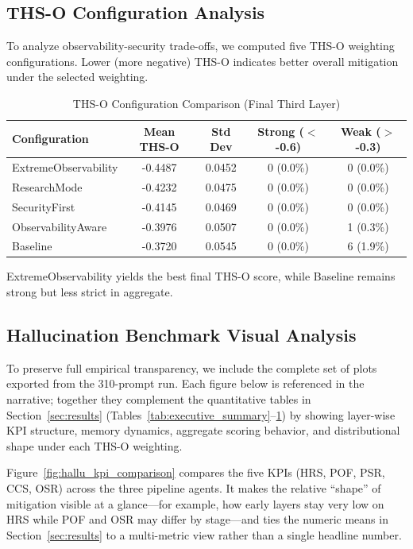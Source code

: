 \documentclass[11pt,a4paper]{article}
\begin{document}
\subsection{THS-O Configuration Analysis}

To analyze observability-security trade-offs, we computed five THS-O weighting configurations.
Lower (more negative) THS-O indicates better overall mitigation under the selected weighting.

\begin{table}[!htbp]
\centering
\caption{THS-O Configuration Comparison (Final Third Layer)}
\label{tab:ths_configs}
\begin{tabular}{lcccc}
\toprule
\textbf{Configuration} & \textbf{Mean THS-O} & \textbf{Std Dev} & \textbf{Strong ($<$ -0.6)} & \textbf{Weak ($>$ -0.3)} \\
\midrule
ExtremeObservability & -0.4487 & 0.0452 & 0 (0.0\%) & 0 (0.0\%) \\
ResearchMode & -0.4232 & 0.0475 & 0 (0.0\%) & 0 (0.0\%) \\
SecurityFirst & -0.4145 & 0.0469 & 0 (0.0\%) & 0 (0.0\%) \\
ObservabilityAware & -0.3976 & 0.0507 & 0 (0.0\%) & 1 (0.3\%) \\
Baseline & -0.3720 & 0.0545 & 0 (0.0\%) & 6 (1.9\%) \\
\bottomrule
\end{tabular}
\end{table}

ExtremeObservability yields the best final THS-O score, while Baseline remains strong but less strict in aggregate.

\subsection{Hallucination Benchmark Visual Analysis}
\label{sec:visual_benchmark}

To preserve full empirical transparency, we include the complete set of plots exported from the 310-prompt run.
Each figure below is referenced in the narrative; together they complement the quantitative tables in Section~\ref{sec:results} (Tables~\ref{tab:executive_summary}--\ref{tab:ths_configs}) by showing layer-wise KPI structure, memory dynamics, aggregate scoring behavior, and distributional shape under each THS-O weighting.

Figure~\ref{fig:hallu_kpi_comparison} compares the five KPIs (HRS, POF, PSR, CCS, OSR) across the three pipeline agents.
It makes the relative ``shape'' of mitigation visible at a glance---for example, how early layers stay very low on HRS while POF and OSR may differ by stage---and ties the numeric means in Section~\ref{sec:results} to a multi-metric view rather than a single headline number.
\end{document}
